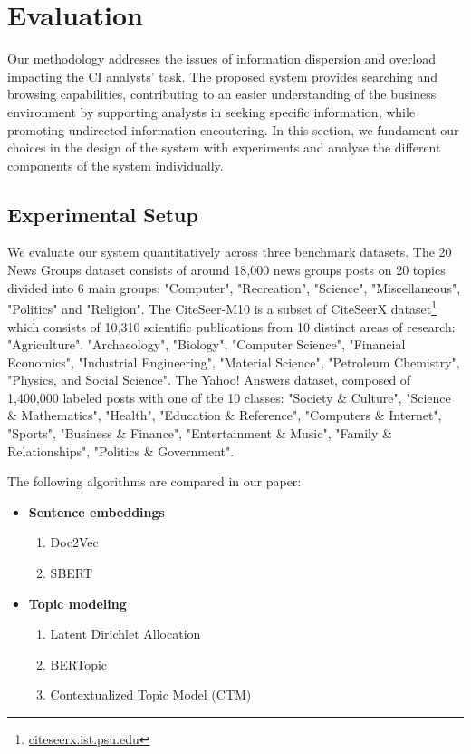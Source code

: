 \documentclass[a4paper]{article}
\begin{document}
\section{Evaluation}
Our methodology addresses the issues of information dispersion and overload impacting the CI analysts' task. The proposed system provides searching and browsing capabilities, contributing to an easier understanding of the business environment by supporting analysts in seeking specific information, while promoting undirected information encoutering. In this section, we fundament our choices in the design of the system with experiments and analyse the different components of the system individually.

\subsection{Experimental Setup}
We evaluate our system quantitatively across three benchmark datasets. The 20 News Groups \citep{pedregosa2011} dataset consists of around 18,000 news groups posts on 20 topics divided into 6 main groups: "Computer", "Recreation", "Science", "Miscellaneous", "Politics" and "Religion". The CiteSeer-M10 \citep{lim2014, pan2016} is a subset of CiteSeerX dataset\footnote{\href{http://citeseerx.ist.psu.edu/}{citeseerx.ist.psu.edu}} which consists of 10,310 scientific publications from 10 distinct areas of research: "Agriculture", "Archaeology", "Biology", "Computer Science", "Financial Economics", "Industrial Engineering", "Material Science", "Petroleum Chemistry", "Physics, and Social Science". The Yahoo! Answers \citep{yin2019, zhang2015} dataset, composed of 1,400,000 labeled posts with one of the 10 classes: "Society \& Culture", "Science \& Mathematics", "Health", "Education \& Reference", "Computers \& Internet", "Sports", "Business \& Finance", "Entertainment \& Music", "Family \& Relationships", "Politics \& Government".

The following algorithms are compared in our paper:
\begin{itemize}
  \item \textbf{Sentence embeddings}
    \begin{enumerate}
      \item Doc2Vec
      \item SBERT
    \end{enumerate}
  \item \textbf{Topic modeling}
    \begin{enumerate}
      \item Latent Dirichlet Allocation
      \item BERTopic
      \item Contextualized Topic Model (CTM)
    \end{enumerate}
\end{itemize}
\end{document}

